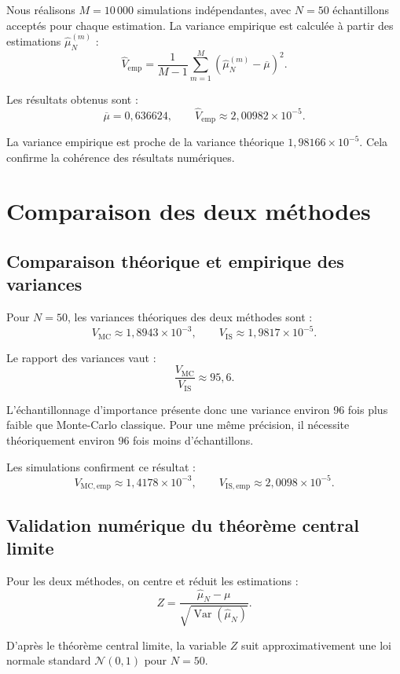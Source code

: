 \documentclass[12pt,a4paper]{article}
\begin{document}
Nous réalisons $M=10\,000$ simulations indépendantes,
avec $N=50$ échantillons acceptés pour chaque estimation.
La variance empirique est calculée à partir des estimations
$\widehat{\mu}_N^{(m)}$ :
\[
\widehat V_{\mathrm{emp}}
=\frac{1}{M-1}\sum_{m=1}^{M}
\left(\widehat{\mu}_N^{(m)}-\overline{\mu}\right)^2.
\]

Les résultats obtenus sont :
\[
\overline{\mu}=0{,}636624,
\qquad
\widehat V_{\mathrm{emp}}\approx 2{,}00982\times10^{-5}.
\]

La variance empirique est proche de la variance théorique
$1{,}98166\times10^{-5}$. Cela confirme la cohérence
des résultats numériques.

\section{Comparaison des deux méthodes}

\subsection{Comparaison théorique et empirique des variances}

Pour $N=50$, les variances théoriques des deux méthodes sont :
\[
V_{\mathrm{MC}} \approx 1{,}8943\times10^{-3},
\qquad
V_{\mathrm{IS}} \approx 1{,}9817\times10^{-5}.
\]

Le rapport des variances vaut :
\[
\boxed{
\frac{V_{\mathrm{MC}}}{V_{\mathrm{IS}}}
\approx 95{,}6.
}
\]

L'échantillonnage d'importance présente donc une variance
environ 96 fois plus faible que Monte-Carlo classique.
Pour une même précision, il nécessite théoriquement
environ 96 fois moins d'échantillons.

Les simulations confirment ce résultat :
\[
V_{\mathrm{MC,emp}}\approx 1{,}4178\times10^{-3},
\qquad
V_{\mathrm{IS,emp}}\approx 2{,}0098\times10^{-5}.
\]

\subsection{Validation numérique du théorème central limite}

Pour les deux méthodes, on centre et réduit les estimations :
\[
Z=\frac{\widehat{\mu}_N-\mu}
{\sqrt{\operatorname{Var}(\widehat{\mu}_N)}}.
\]

D'après le théorème central limite, la variable $Z$ suit
approximativement une loi normale standard $\mathcal{N}(0,1)$
pour $N=50$.
\end{document}
